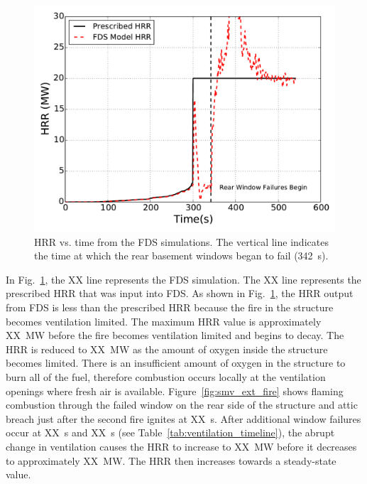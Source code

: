 \documentclass[12pt,oneside]{book}
\begin{document}
\begin{figure}[!ht]
\includegraphics[width=5.5in]{../Figures/Fire_HRR}
\caption[HRR vs. time from the FDS simulations.]
{HRR vs. time from the FDS simulations. The vertical line indicates the time at which the rear basement windows began to fail (342~s).}
\label{fig:hrr}
\end{figure}

In Fig.~\ref{fig:hrr}, the XX line represents the FDS simulation. The XX line represents the prescribed HRR that was input into FDS. As shown in Fig.~\ref{fig:hrr}, the HRR output from FDS is less than the prescribed HRR because the fire in the structure becomes ventilation limited. The maximum HRR value is approximately XX~MW before the fire becomes ventilation limited and begins to decay. The HRR is reduced to XX~MW as the amount of oxygen inside the structure becomes limited. There is an insufficient amount of oxygen in the structure to burn all of the fuel, therefore combustion occurs locally at the ventilation openings where fresh air is available. Figure~\ref{fig:smv_ext_fire} shows flaming combustion through the failed window on the rear side of the structure and attic breach just after the second fire ignites at XX~s. After additional window failures occur at XX~s and XX~s (see Table~\ref{tab:ventilation_timeline}), the abrupt change in ventilation causes the HRR to increase to XX~MW before it decreases to approximately XX~MW. The HRR then increases towards a steady-state value.
\end{document}
